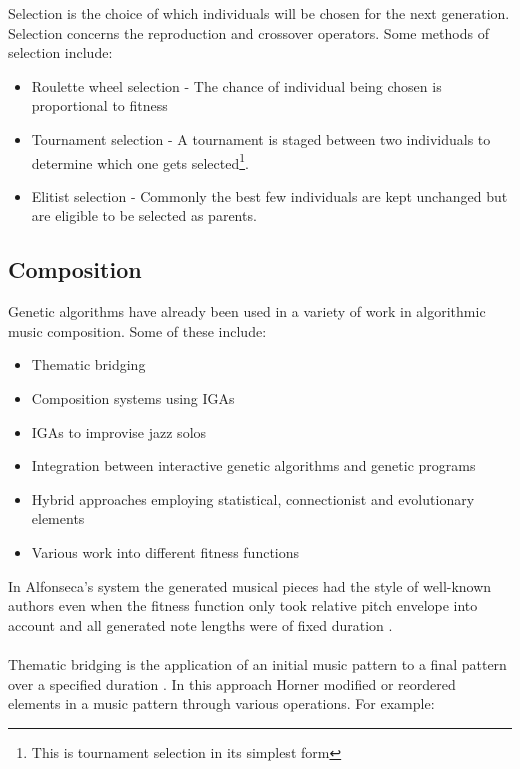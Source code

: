 Selection is the choice of which individuals will be chosen for the next generation. Selection concerns the reproduction and crossover operators. Some methods of selection include: 
\begin{itemize}
\item Roulette wheel selection - The chance of individual being chosen is proportional to fitness
\item Tournament selection - A tournament is staged between two individuals to determine which one gets selected\footnote{This is tournament selection in its simplest form}.
\item Elitist selection - Commonly the best few individuals are kept unchanged but are eligible to be selected as parents.
\end{itemize}

\subsection{Composition}

Genetic algorithms have already been used in a variety of work in algorithmic music composition. Some of these include:
\begin{itemize}
\item Thematic bridging \cite{Horner1991}
\item Composition systems using \acsp{IGA} \cite{1412045}
\item \acsp{IGA} to improvise jazz solos \cite{Biles1996, Biles1994}
\item Integration between interactive genetic algorithms and genetic programs \cite{Tokui2000}
\item Hybrid approaches employing statistical, connectionist and evolutionary elements \cite{Manaris2007}
\item Various work into different fitness functions
\end{itemize}

In Alfonseca's system the generated musical pieces had the style of well-known authors even when the fitness function only took relative pitch envelope into account and all generated note lengths were of fixed duration \cite{Alfonseca2007}.
\\
\\
Thematic bridging is the application of an initial music pattern to a final pattern over a specified duration \cite{Horner1991}. In this approach Horner modified or reordered elements in a music pattern through various operations. For example:

